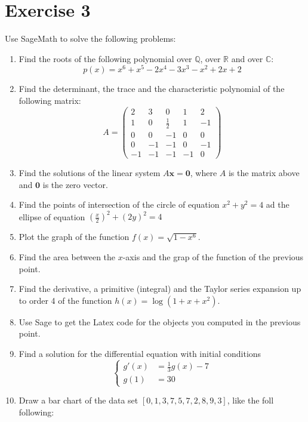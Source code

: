 \documentclass[12pt,a4paper]{article}
\theoremstyle{definition}
\theoremstyle{definition}
\begin{document}
\section*{Exercise 3}
Use SageMath to solve the following problems:
\begin{enumerate}[label=(\arabic*)]
	\item Find the roots of the following polynomial over $\mathbb Q$,
		over $\mathbb R$ and over $\mathbb C$:
		\[ p(x) = x^6+x^5-2x^4-3x^3-x^2+2x+2 \]
	\item Find the determinant, the trace and the characteristic polynomial
		   of the following matrix:
		\[A=
		\left(\begin{array}{rrrrr}
		2 & 3 & 0 & 1 & 2 \\
		1 & 0 & \frac{1}{2} & 1 & -1 \\
		0 & 0 & -1 & 0 & 0 \\
		0 & -1 & -1 & 0 & -1 \\
		-1 & -1 & -1 & -1 & 0
		\end{array}\right)
		\]
	\item Find the solutions of the linear system $A\mathbf x=\mathbf 0$, where
		$A$ is the matrix above and $\mathbf 0$ is the zero vector.
	\item Find the points of intersection of the circle of equation $x^2+y^2=4$
		   ad the ellipse of equation $\left(\frac{x}{2}\right)^2+(2y)^2=4$
	\item Plot the graph of the function $f(x)=\sqrt{1-x^6}$.
	\item Find the area between the $x$-axis and the grap of the function of
		   the previous point.
	\item Find the derivative, a primitive (integral) and the Taylor series
	      expansion up to order 4 of the function $h(x)=\log(1+x+x^2)$.
	\item Use Sage to get the Latex code for the objects you computed in
		the previous point.
	\item Find a solution for the differential equation with initial conditions
		   \[
			\begin{cases}g'(x)&=\frac{1}{3}g(x) - 7\\g(1)&=30\end{cases}
		   \]
	\item Draw a bar chart of the data set $[0,1,3,7,5,7,2,8,9,3]$, like the foll
	      following:
		\begin{center}

\end{center}
\end{enumerate}
\end{document}
